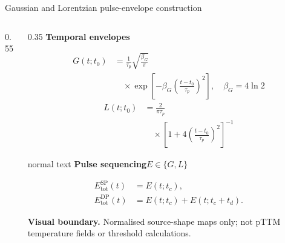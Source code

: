 \documentclass[aspectratio=169,10pt]{beamer}
\begin{document}
\begin{frame}[t]{Gaussian and Lorentzian pulse-envelope construction}
  \hypertarget{supp:physics-temporal-envelopes}{}
  \vspace{-0.18cm}\hfill
  \hspace{0.10cm}\GVBackupIndexButton
  \vspace{0.03cm}
  \begin{columns}[T,totalwidth=0.95\textwidth]
    \begin{column}{0.55\textwidth}
      \centering
    \end{column}
    \begin{column}{0.35\textwidth}
      \scriptsize\textbf{\color{GVSourceBlue}Temporal envelopes}\par
      \vspace{-0.08cm}
      {\tiny\[
      \begin{aligned}
      G(t;t_0)&=\frac{1}{\tau_p}\sqrt{\frac{\beta_G}{\pi}}\\[-0.08cm]
      &\quad\times\exp\!\left[-\beta_G\left(\frac{t-t_0}{\tau_p}\right)^2\right],\quad \beta_G=4\ln2
      \end{aligned}
      \]}
      \vspace{-0.40cm}
      {\tiny\[
      \begin{aligned}
      L(t;t_0)&=\frac{2}{\pi\tau_p}\\[-0.08cm]
      &\quad\times\left[1+4\left(\frac{t-t_0}{\tau_p}\right)^2\right]^{-1}
      \end{aligned}
      \]}
      \vspace{-0.27cm}
      \begin{beamercolorbox}[wd=\linewidth,sep=0.40em]{normal text}
        \scriptsize\textbf{\color{GVTeal}Pulse sequencing}\hfill\(E\in\{G,L\}\)\par
        \vspace{-0.10cm}
        {\tiny\[
        \begin{aligned}
        E_{\mathrm{tot}}^{\mathrm{SP}}(t)&=E(t;t_c),\\[-0.05cm]
        E_{\mathrm{tot}}^{\mathrm{DP}}(t)&=E(t;t_c)+E(t;t_c+t_d).
        \end{aligned}
        \]}
        \vspace{-0.14cm}
      \end{beamercolorbox}
      \vspace{0.05cm}
      {\tiny\color{GVSlate}\textbf{Visual boundary.} Normalised source-shape maps only; not pTTM temperature fields or threshold calculations.}
    \end{column}
  \end{columns}
\end{frame}
\end{document}
